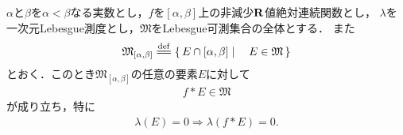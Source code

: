 	\begin{screen}
		\begin{thm}[絶対連続関数は有界変動である]
		\end{thm}
	\end{screen}
	
	\begin{screen}
		\begin{thm}[絶対連続な非減少関数は可測集合を可測集合に写す]
		\label{thm:absolutely_continuous_functions_map_measurable_set_to_measurable_set}
			$\alpha$と$\beta$を$\alpha<\beta$なる実数とし，$f$を$[\alpha,\beta]$上の非減少$\mathbf{R}$値絶対連続関数とし，
			$\lambda$を一次元Lebesgue測度とし，$\mathfrak{M}$をLebesgue可測集合の全体とする．
			また
			\begin{align}
				\mathfrak{M}_{[\alpha,\beta]} \defeq \Set{E \cap [\alpha,\beta]}{E \in \mathfrak{M}}
			\end{align}
			とおく．このとき$\mathfrak{M}_{[\alpha,\beta]}$の任意の要素$E$に対して
			\begin{align}
				f \ast E \in \mathfrak{M}
			\end{align}
			が成り立ち，特に
			\begin{align}
				\lambda(E) = 0 \Longrightarrow \lambda(f \ast E) = 0.
			\end{align}
		\end{thm}
	\end{screen}
	
